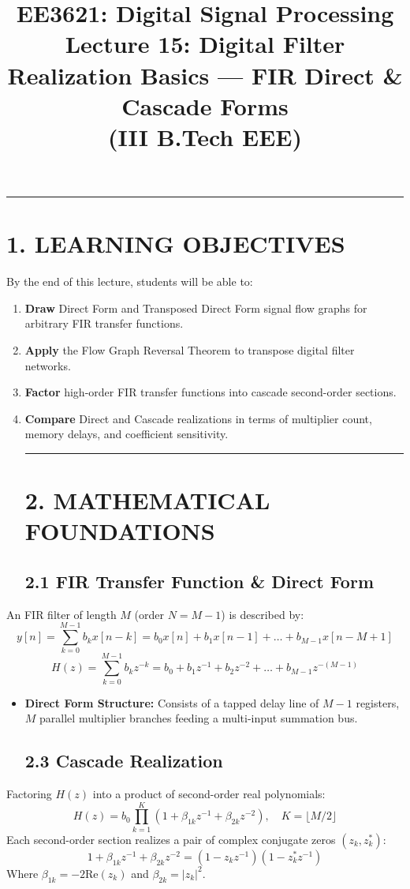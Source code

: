 \documentclass[11pt,a4paper]{article}
\begin{document}
\title{\textbf{EE3621: Digital Signal Processing} \\ \Large Lecture 15: Digital Filter Realization Basics — FIR Direct \& Cascade Forms \\ \large (III B.Tech EEE)}\maketitle

\noindent\rule{\textwidth}{0.5pt}
\section*{1. LEARNING OBJECTIVES}
By the end of this lecture, students will be able to:
\begin{enumerate}
\item \textbf{Draw} Direct Form and Transposed Direct Form signal flow graphs for arbitrary FIR transfer functions.
\item \textbf{Apply} the Flow Graph Reversal Theorem to transpose digital filter networks.
\item \textbf{Factor} high-order FIR transfer functions into cascade second-order sections.
\item \textbf{Compare} Direct and Cascade realizations in terms of multiplier count, memory delays, and coefficient sensitivity.

\noindent\rule{\textwidth}{0.5pt}
\section*{2. MATHEMATICAL FOUNDATIONS}

\subsection*{2.1 FIR Transfer Function \& Direct Form}
\end{enumerate}
An FIR filter of length $M$ (order $N = M-1$) is described by:
$$ y[n] = \sum_{k=0}^{M-1} b_k x[n-k] = b_0 x[n] + b_1 x[n-1] + \dots + b_{M-1} x[n - M + 1] $$
$$ H(z) = \sum_{k=0}^{M-1} b_k z^{-k} = b_0 + b_1 z^{-1} + b_2 z^{-2} + \dots + b_{M-1} z^{-(M-1)} $$
\begin{itemize}
\item \textbf{Direct Form Structure:} Consists of a tapped delay line of $M-1$ registers, $M$ parallel multiplier branches feeding a multi-input summation bus.

\subsection*{2.3 Cascade Realization}
\end{itemize}
Factoring $H(z)$ into a product of second-order real polynomials:
$$ H(z) = b_0 \prod_{k=1}^{K} (1 + \beta_{1k} z^{-1} + \beta_{2k} z^{-2}), \quad K = \lfloor M/2 \rfloor $$
Each second-order section realizes a pair of complex conjugate zeros $(z_k, z_k^*)$:
$$ 1 + \beta_{1k} z^{-1} + \beta_{2k} z^{-2} = (1 - z_k z^{-1})(1 - z_k^* z^{-1}) $$
Where $\beta_{1k} = -2\text{Re}(z_k)$ and $\beta_{2k} = |z_k|^2$.
\end{document}
